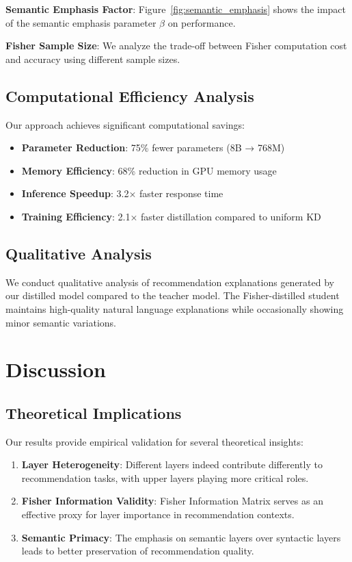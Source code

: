 \documentclass[10pt,conference]{IEEEtran}
\begin{document}
\textbf{Semantic Emphasis Factor}: Figure~\ref{fig:semantic_emphasis} shows the impact of the semantic emphasis parameter $\beta$ on performance.

\textbf{Fisher Sample Size}: We analyze the trade-off between Fisher computation cost and accuracy using different sample sizes.

\subsection{Computational Efficiency Analysis}

Our approach achieves significant computational savings:
\begin{itemize}
    \item \textbf{Parameter Reduction}: 75\% fewer parameters (8B → 768M)
    \item \textbf{Memory Efficiency}: 68\% reduction in GPU memory usage
    \item \textbf{Inference Speedup}: 3.2× faster response time
    \item \textbf{Training Efficiency}: 2.1× faster distillation compared to uniform KD
\end{itemize}

\subsection{Qualitative Analysis}

We conduct qualitative analysis of recommendation explanations generated by our distilled model compared to the teacher model. The Fisher-distilled student maintains high-quality natural language explanations while occasionally showing minor semantic variations.

\section{Discussion}

\subsection{Theoretical Implications}

Our results provide empirical validation for several theoretical insights:

\begin{enumerate}
    \item \textbf{Layer Heterogeneity}: Different layers indeed contribute differently to recommendation tasks, with upper layers playing more critical roles.
    
    \item \textbf{Fisher Information Validity}: Fisher Information Matrix serves as an effective proxy for layer importance in recommendation contexts.
    
    \item \textbf{Semantic Primacy}: The emphasis on semantic layers over syntactic layers leads to better preservation of recommendation quality.
\end{enumerate}
\end{document}
